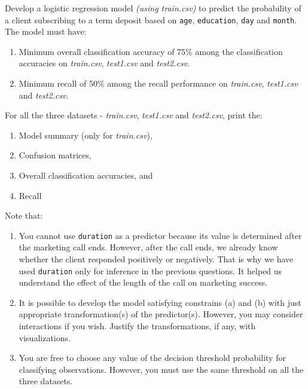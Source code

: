 \documentclass[
  letterpaper,
  DIV=11,
  numbers=noendperiod]{scrreprt}
\begin{document}
Develop a logistic regression model \emph{(using train.csv)} to predict
the probability of a client subscribing to a term deposit based on
\texttt{age}, \texttt{education}, \texttt{day} and \texttt{month}. The
model must have:

\begin{enumerate}
\def\labelenumi{\alph{enumi}.}
\item
  Minimum overall classification accuracy of 75\% among the
  classification accuracies on \emph{train.csv}, \emph{test1.csv} and
  \emph{test2.csv}.
\item
  Minimum recall of 50\% among the recall performance on
  \emph{train.csv}, \emph{test1.csv} and \emph{test2.csv}.
\end{enumerate}

For all the three datasets - \emph{train.csv}, \emph{test1.csv} and
\emph{test2.csv}, print the:

\begin{enumerate}
\def\labelenumi{\arabic{enumi}.}
\item
  Model summary (only for \emph{train.csv}),
\item
  Confusion matrices,
\item
  Overall classification accuracies, and
\item
  Recall
\end{enumerate}

Note that:

\begin{enumerate}
\def\labelenumi{\arabic{enumi}.}
\item
  You cannot use \texttt{duration} as a predictor because its value is
  determined after the marketing call ends. However, after the call
  ends, we already know whether the client responded positively or
  negatively. That is why we have used \texttt{duration} only for
  inference in the previous questions. It helped us understand the
  effect of the length of the call on marketing success.
\item
  It is possible to develop the model satisfying constrains (a) and (b)
  with just appropriate transformation(s) of the predictor(s). However,
  you may consider interactions if you wish. Justify the
  transformations, if any, with visualizations.
\item
  You are free to choose any value of the decision threshold probability
  for classifying observations. However, you must use the same threshold
  on all the three datasets.
\end{enumerate}
\end{document}
